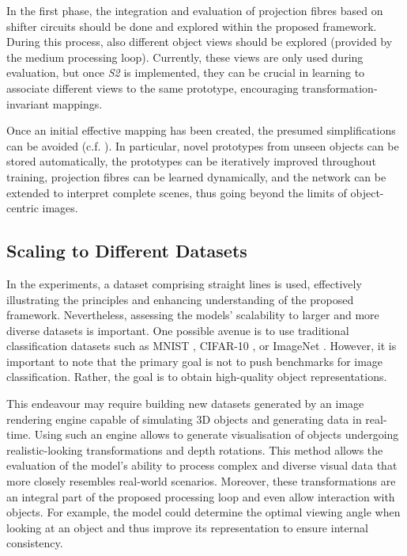 In the first phase, the integration and evaluation of projection fibres based on shifter circuits  should be done and explored within the proposed framework.
During this process, also different object views should be explored (provided by the medium processing loop). Currently, these views are only used during evaluation, but once \emph{S2} is implemented, they can be crucial in learning to associate different views to the same prototype, encouraging transformation-invariant mappings.

Once an initial effective mapping has been created, the presumed simplifications can be avoided (c.f. ). In particular, novel prototypes from unseen objects can be stored automatically, the prototypes can be iteratively improved throughout training, projection fibres can be learned dynamically, and the network can be extended to interpret complete scenes, thus going beyond the limits of object-centric images.






\subsection{Scaling to Different Datasets}
In the experiments, a dataset comprising straight lines is used, effectively illustrating the principles and enhancing understanding of the proposed framework.
Nevertheless, assessing the models' scalability to larger and more diverse datasets is important.
One possible avenue is to use traditional classification datasets such as MNIST , CIFAR-10 , or ImageNet .
However, it is important to note that the primary goal is not to push benchmarks for image classification.
Rather, the goal is to obtain high-quality object representations.

This endeavour may require building new datasets generated by an image rendering engine capable of simulating 3D objects and generating data in real-time.
Using such an engine allows to generate visualisation of objects undergoing realistic-looking transformations and depth rotations.
This method allows the evaluation of the model's ability to process complex and diverse visual data that more closely resembles real-world scenarios.
Moreover, these transformations are an integral part of the proposed processing loop and even allow interaction with objects. For example, the model could determine the optimal viewing angle when looking at an object and thus improve its representation to ensure internal consistency.




